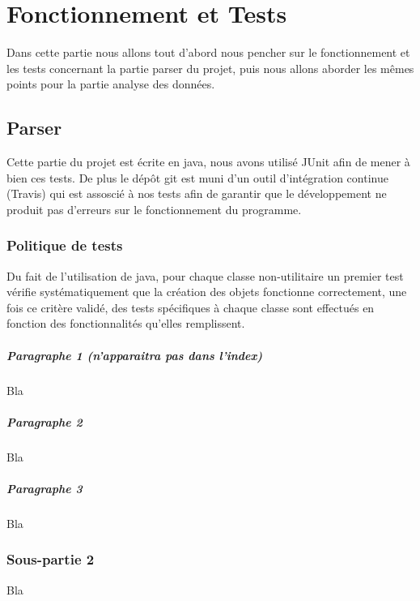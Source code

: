 \chapter{Fonctionnement et Tests}

Dans cette partie nous allons tout d'abord nous pencher sur le fonctionnement et les tests concernant la partie parser du projet, puis nous allons aborder les mêmes points pour la partie analyse des données.

\section{Parser}

Cette partie du projet est écrite en java, nous avons utilisé JUnit afin de mener à bien ces tests. De plus le dépôt git est muni d'un outil d'intégration continue (Travis) qui est assoscié à nos tests afin de garantir que le développement ne produit pas d'erreurs sur le fonctionnement du programme.

\subsection{Politique de tests}

Du fait de l'utilisation de java, pour chaque classe non-utilitaire un premier test vérifie systématiquement que la création des objets fonctionne correctement, une fois ce critère validé, des tests spécifiques à chaque classe sont effectués en fonction des fonctionnalités qu'elles remplissent.

\paragraph*{Paragraphe 1 (n'apparaitra pas dans l'index)} Bla

\paragraph*{Paragraphe 2} Bla

\paragraph*{Paragraphe 3} Bla

\subsection{Sous-partie 2}

Bla

